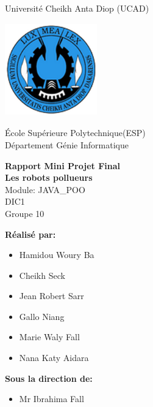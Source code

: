 \documentclass[12pt , a4paper]{report}
\begin{document}
	\begin{center}
		\normalsize{Université Cheikh Anta Diop (UCAD)}\\
		\begin{center}
			\includegraphics[width=4cm,height=4cm]{Logo_ucad_2.png}
		\end{center}
		\normalsize{École Supérieure Polytechnique(ESP)}\\
		\normalsize{Département Génie Informatique}\\
	\end{center}
	
	\begin{center}
		\Huge{\textbf{Rapport Mini Projet Final}}\\
		\vspace{0.7cm}
		\LARGE{\textbf{Les robots pollueurs}}\\
		\vspace{0.7cm}
		\large{Module: JAVA\_POO}\\
		\vspace{0.2cm}
		\large{DIC1}\\
		\vspace{0.2cm}
		\large{Groupe 10}\\
	\end{center}

	\begin{multicols}{2}
		\textbf{Réalisé par:}
		\begin{itemize}
			\item Hamidou Woury Ba
			\item Cheikh Seck
			\item Jean Robert Sarr
			\item Gallo Niang
			\item Marie Waly Fall
			\item Nana Katy Aidara
		\end{itemize}
		\columnbreak
		\textbf{Sous la direction de:}
		\begin{itemize}
			\item Mr Ibrahima Fall
		\end{itemize}
	\end{multicols}
	\begin{center}
	\end{center}
	
\end{document}
